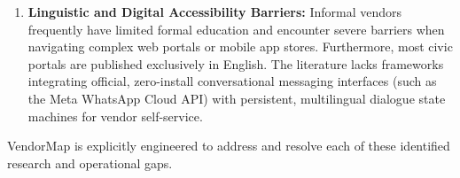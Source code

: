 \begin{enumerate}
    \item \textbf{Linguistic and Digital Accessibility Barriers:} Informal vendors frequently have limited formal education and encounter severe barriers when navigating complex web portals or mobile app stores. Furthermore, most civic portals are published exclusively in English. The literature lacks frameworks integrating official, zero-install conversational messaging interfaces (such as the Meta WhatsApp Cloud API) with persistent, multilingual dialogue state machines for vendor self-service.
\end{enumerate}

VendorMap is explicitly engineered to address and resolve each of these identified research and operational gaps.
